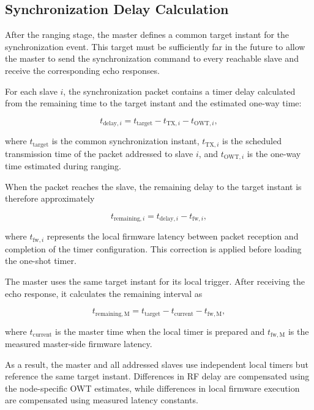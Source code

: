 \subsection{Synchronization Delay Calculation}

After the ranging stage, the master defines a common target instant for the synchronization event. This target must be sufficiently far in the future to allow the master to send the synchronization command to every reachable slave and receive the corresponding echo responses.

For each slave $i$, the synchronization packet contains a timer delay calculated from the remaining time to the target instant and the estimated one-way time:

\begin{equation}
    t_{\mathrm{delay},i}
    =
    t_{\mathrm{target}}
    -
    t_{\mathrm{TX},i}
    -
    t_{\mathrm{OWT},i},
\end{equation}

where $t_{\mathrm{target}}$ is the common synchronization instant, $t_{\mathrm{TX},i}$ is the scheduled transmission time of the packet addressed to slave $i$, and $t_{\mathrm{OWT},i}$ is the one-way time estimated during ranging.

When the packet reaches the slave, the remaining delay to the target instant is therefore approximately

\begin{equation}
    t_{\mathrm{remaining},i}
    =
    t_{\mathrm{delay},i}
    -
    t_{\mathrm{fw},i},
\end{equation}

where $t_{\mathrm{fw},i}$ represents the local firmware latency between packet reception and completion of the timer configuration. This correction is applied before loading the one-shot timer.

The master uses the same target instant for its local trigger. After receiving the echo response, it calculates the remaining interval as

\begin{equation}
    t_{\mathrm{remaining,M}}
    =
    t_{\mathrm{target}}
    -
    t_{\mathrm{current}}
    -
    t_{\mathrm{fw,M}},
\end{equation}

where $t_{\mathrm{current}}$ is the master time when the local timer is prepared and $t_{\mathrm{fw,M}}$ is the measured master-side firmware latency.

As a result, the master and all addressed slaves use independent local timers but reference the same target instant. Differences in RF delay are compensated using the node-specific OWT estimates, while differences in local firmware execution are compensated using measured latency constants.


